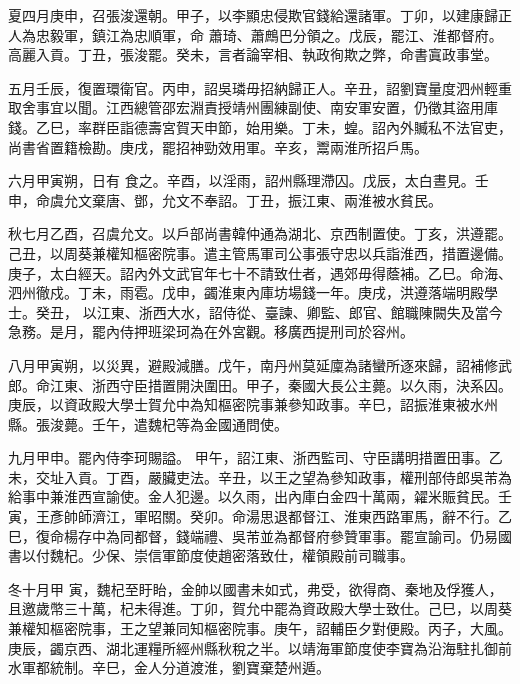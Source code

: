 \begin{pinyinscope}
 夏四月庚申，召張浚還朝。甲子，以李顯忠侵欺官錢給還諸軍。丁卯，以建康歸正人為忠毅軍，鎮江為忠順軍，命
 蕭琦、蕭鷓巴分領之。戊辰，罷江、淮都督府。高麗入貢。丁丑，張浚罷。癸未，言者論宰相、執政徇欺之弊，命書寘政事堂。



 五月壬辰，復置環衛官。丙申，詔吳璘毋招納歸正人。辛丑，詔劉寶量度泗州輕重取舍事宜以聞。江西總管邵宏淵責授靖州團練副使、南安軍安置，仍徵其盜用庫錢。乙巳，率群臣詣德壽宮賀天申節，始用樂。丁未，蝗。詔內外贓私不法官吏，尚書省置籍檢勘。庚戌，罷招神勁效用軍。辛亥，鬻兩淮所招戶馬。



 六月甲寅朔，日有
 食之。辛酉，以淫雨，詔州縣理滯囚。戊辰，太白晝見。壬申，命虞允文棄唐、鄧，允文不奉詔。丁丑，振江東、兩淮被水貧民。



 秋七月乙酉，召虞允文。以戶部尚書韓仲通為湖北、京西制置使。丁亥，洪遵罷。己丑，以周葵兼權知樞密院事。遣主管馬軍司公事張守忠以兵詣淮西，措置邊備。庚子，太白經天。詔內外文武官年七十不請致仕者，遇郊毋得蔭補。乙巳。命海、泗州徹戍。丁未，雨雹。戊申，蠲淮東內庫坊場錢一年。庚戌，洪遵落端明殿學士。癸丑，
 以江東、浙西大水，詔侍從、臺諫、卿監、郎官、館職陳闕失及當今急務。是月，罷內侍押班梁珂為在外宮觀。移廣西提刑司於容州。



 八月甲寅朔，以災異，避殿減膳。戊午，南丹州莫延廩為諸蠻所逐來歸，詔補修武郎。命江東、浙西守臣措置開決圍田。甲子，秦國大長公主薨。以久雨，決系囚。庚辰，以資政殿大學士賀允中為知樞密院事兼參知政事。辛巳，詔振淮東被水州縣。張浚薨。壬午，遣魏杞等為金國通問使。



 九月甲申。罷內侍李珂賜謚。
 甲午，詔江東、浙西監司、守臣講明措置田事。乙未，交址入貢。丁酉，嚴臟吏法。辛丑，以王之望為參知政事，權刑部侍郎吳芾為給事中兼淮西宣諭使。金人犯邊。以久雨，出內庫白金四十萬兩，糴米賑貧民。壬寅，王彥帥師濟江，軍昭關。癸卯。命湯思退都督江、淮東西路軍馬，辭不行。乙巳，復命楊存中為同都督，錢端禮、吳芾並為都督府參贊軍事。罷宣諭司。仍易國書以付魏杞。少保、崇信軍節度使趙密落致仕，權領殿前司職事。



 冬十月甲
 寅，魏杞至盱眙，金帥以國書未如式，弗受，欲得商、秦地及俘獲人，且邀歲幣三十萬，杞未得進。丁卯，賀允中罷為資政殿大學士致仕。己巳，以周葵兼權知樞密院事，王之望兼同知樞密院事。庚午，詔輔臣夕對便殿。丙子，大風。庚辰，蠲京西、湖北運糧所經州縣秋稅之半。以靖海軍節度使李寶為沿海駐扎御前水軍都統制。辛巳，金人分道渡淮，劉寶棄楚州遁。




\end{pinyinscope}
